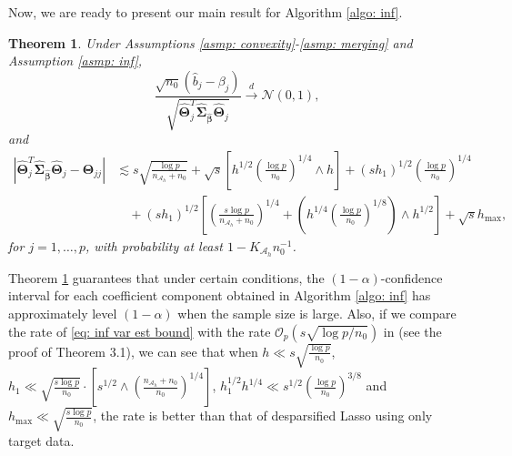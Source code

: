 \documentclass[12pt]{article}
\newcommand{\hb}{\hat{b}}
\newcommand{\norm}[1]{|#1|}
\newcommand{\hbeta}{\hat{\bm{\beta}}}
\newcommand{\mah}{\mathcal{A}_h}
\newcommand{\nah}{n_{\mathcal{A}_h}}
\newcommand{\Kah}{K_{\mah}}
\newcommand{\<}{\langle}
\renewcommand{\>}{\rangle}
\newcommand{\bTheta}{\bm{\Theta}}
\newcommand{\hTheta}{\widehat{\bm{\Theta}}}
\newcommand{\hSigma}{\widehat{\bm{\Sigma}}}
\newtheorem{theorem}{Theorem}
\begin{document}
Now, we are ready to present our main result for Algorithm \ref{algo: inf}.
\begin{theorem}\label{thm: inf}
	Under Assumptions \ref{asmp: convexity}-\ref{asmp: merging} and Assumption \ref{asmp: inf},
	\begin{equation}\label{eq: inf clt}
		\frac{\sqrt{n_0}(\hb_j - \beta_j)}{\sqrt{\hTheta_j^T\hSigma_{\hbeta}\hTheta_j}} \xrightarrow{d} \mathcal{N}(0, 1),
	\end{equation}
	and 
	\begin{align}
		\norm{\hTheta_j^T\hSigma_{\hbeta}\hTheta_j - \bTheta_{jj}} &\lesssim s\sqrt{\frac{\log p}{\nah+n_0}} + \sqrt{s}\left[h^{1/2}\left(\frac{\log p}{n_0}\right)^{1/4}\wedge h\right] + (sh_1)^{1/2}\left(\frac{\log p}{n_0}\right)^{1/4} \\
		&\quad + (sh_1)^{1/2}\left[\left(\frac{s\log p}{\nah+n_0}\right)^{1/4} + \left(h^{1/4}\left(\frac{\log p}{n_0}\right)^{1/8}\right) \wedge h^{1/2}\right] + \sqrt{s}h_{\max}, \label{eq: inf var est bound}
	\end{align}
	for $j = 1, \ldots, p$, with probability at least $1-\Kah n_0^{-1}$.
\end{theorem}

Theorem \ref{thm: inf} guarantees that under certain conditions, the $(1-\alpha)$-confidence interval for each coefficient component obtained in Algorithm \ref{algo: inf} has approximately level $(1-\alpha)$ when the sample size is large. Also, if we compare the rate of \eqref{eq: inf var est bound} with the rate $\mathcal{O}_p(s\sqrt{\log p/n_0})$ in \cite{van2014asymptotically} (see the proof of Theorem 3.1), we can see that when $h \ll s\sqrt{\frac{\log p}{n_0}}$, $h_1 \ll \sqrt{\frac{s\log p}{n_0}} \cdot \left[s^{1/2}\wedge \left(\frac{\nah+n_0}{n_0}\right)^{1/4}\right]$, $h_1^{1/2}h^{1/4} \ll s^{1/2}\left(\frac{\log p}{n_0}\right)^{3/8}$ and $h_{\max} \ll \sqrt{\frac{s\log p}{n_0}}$, the rate is better than that of desparsified Lasso using only target data.


\end{document}
